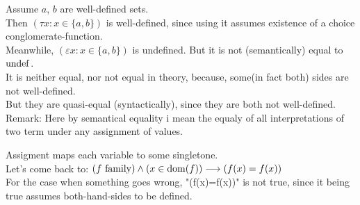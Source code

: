 



Assume $a$, $b$ are well-defined sets.\\
Then $
(\tau x: x \in \{a,b\}) 
$ is well-defined, since using it assumes existence of a choice conglomerate-function.\\
Meanwhile,
$
(\varepsilon x: x \in \{a,b\}) 
$
 is undefined. But it is not (semantically) equal to $\mathrm{undef}$.\\
It is neither equal, nor not equal in theory, because, some(in fact both) sides are not well-defined.\\
But they are quasi-equal (syntactically), since they are both not well-defined.\\
 
Remark: 
Here by semantical equality i mean the equaly of all interpretations of two term under any assignment of values.

Assigment maps each variable to some singletone.\\
Let's come back to:
$(f\mathrm{\ family})\land(x\in\mathrm{dom}(f)) \longrightarrow (f(x)=f(x))$\\
For the case when something goes wrong, "(f(x)=f(x))" is not true, since it being true assumes both-hand-sides to be defined.



